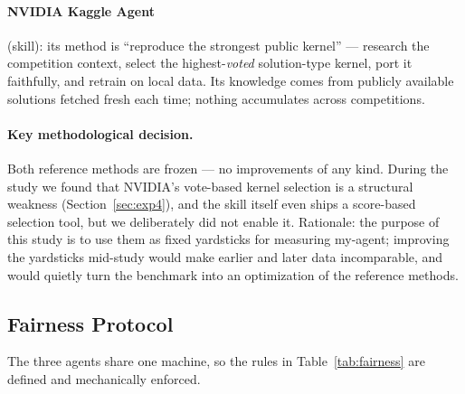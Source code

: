 \documentclass[11pt,a4paper]{article}
\begin{document}
\paragraph{NVIDIA Kaggle Agent} (skill): its method is ``reproduce the strongest public kernel'' --- research the competition context, select the highest-\emph{voted} solution-type kernel, port it faithfully, and retrain on local data. Its knowledge comes from publicly available solutions fetched fresh each time; nothing accumulates across competitions.

\paragraph{Key methodological decision.} Both reference methods are frozen --- no improvements of any kind. During the study we found that NVIDIA's vote-based kernel selection is a structural weakness (Section~\ref{sec:exp4}), and the skill itself even ships a score-based selection tool, but we deliberately did not enable it. Rationale: the purpose of this study is to use them as fixed yardsticks for measuring my-agent; improving the yardsticks mid-study would make earlier and later data incomparable, and would quietly turn the benchmark into an optimization of the reference methods.

\subsection{Fairness Protocol}
\label{sec:fairness}

The three agents share one machine, so the rules in Table~\ref{tab:fairness} are defined and mechanically enforced.
\end{document}

